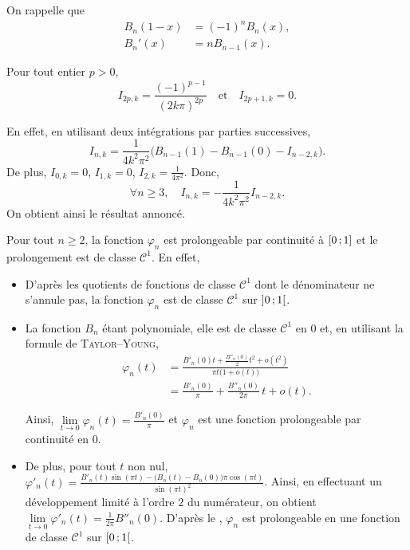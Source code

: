 On rappelle que 
\begin{align*}
B_n(1 - x) &= (-1)^n B_n(x),\\
B_n'(x) &= n B_{n-1}(x).
\end{align*}

\begin{elemsolution}
\begin{reponses}
\item Pour tout entier $p > 0$,
\[
I_{2p, k} = \frac{(-1)^{p-1}}{(2 k \pi)^{2p}} \quad \text{et} \quad I_{2p+1,k} = 0.
\]

En effet, en utilisant deux intégrations par parties successives,
\[
I_{n,k} = \frac{1}{4k^2 \pi^2} \big(B_{n-1}(1) - B_{n-1}(0) - I_{n-2, k} \big).
\]
De plus, $I_{0,k} = 0$, $I_{1,k} = 0$, $I_{2,k} = \frac{1}{4 \pi^2}$. Donc,
\[
\forall n \geqslant 3,\quad I_{n,k} = - \frac{1}{4 k^2 \pi^2}I_{n-2, k}.
\]
On obtient ainsi le résultat annoncé.
\item Pour tout $n \geqslant 2$, la fonction $\varphi_n$ est prolongeable par continuité à $\left[0\,;1\right]$ et le prolongement est de classe $\mathscr{C}^1$. En effet,

\begin{itemize}
\item D'après les quotients de fonctions de classe $\mathscr{C}^1$ dont le dénominateur ne s'annule pas, la fonction $\varphi_n$ est de classe $\mathscr{C}^1$ sur $\left]0\,;1\right[$.

\item La fonction $B_n$ étant polynomiale, elle est de classe $\mathscr{C}^1$ en $0$ et, en utilisant la formule de \textsc{Taylor}--\textsc{Young},
\begin{align*}
\varphi_n(t) &= \frac{B'_n(0)t + \frac{B''_n(0)}{2}t^2 + o(t^2)}{\pi t \big(1 + o(t) \big)} \\
&= \frac{B'_n(0)}{\pi} + \frac{B''_n(0)}{2 \pi} \, t + o(t).
\end{align*}

Ainsi, $\lim\limits_{t \to 0} \varphi_n(t) = \frac{B'_n(0)}{\pi}$ et $\varphi_n$ est une fonction prolongeable par continuité en $0$.

\item
%
De plus, pour tout $t$ non nul, $\displaystyle \varphi'_n(t) = \frac{B'_n(t) \sin(\pi t) - \big(B_n(t) - B_n(0) \big) \pi \cos(\pi t)}{\sin(\pi t)^2}$. Ainsi, en effectuant un développement limité à l'ordre $2$ du numérateur, on obtient $\lim\limits_{t \to 0} \varphi'_n(t) = \frac{1}{2 \pi} B''_n(0)$.
D'après le , $\varphi_n$ est prolongeable en une fonction de classe $\mathscr{C}^1$ sur $\left[0\,;1\right[$.


\end{itemize}
\end{reponses}
\end{elemsolution}

